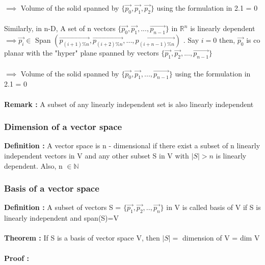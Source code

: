 \documentclass{article}
\begin{document}
    $\implies$ Volume of the solid spanned by $\{ \Vec{p_0},\Vec{p_1},\Vec{p_2}\}$ using the formulation in 2.1 = 0 \\ \\
    Similarly, in n-D, A set of n vectors $\{ \Vec{p_0},\Vec{p_1},...,\Vec{p_{n-1}}\}$ in $\mathbb{R}^n$ is linearly dependent $\implies \Vec{p_i} \in$ Span $(\Vec{p_{(i+1)\%n}},\Vec{p_{(i+2)\%n}},...,\Vec{p_{(i+n-1)\%n}})$ . Say $i = 0$ then, $\Vec{p_0}$ is co planar with the "hyper" plane spanned by vectors $\{ \Vec{p_1},\Vec{p_2},...,\Vec{p_{n-1}}\}$ \\ \\
    $\implies$ Volume of the solid spanned by $\{ \Vec{p_0},\Vec{p_1},...,\Vec{p_{n-1}}\}$ using the formulation in 2.1 = 0 \\ \\
    \textbf{Remark : } A subset of any linearly independent set is also linearly independent 
    \subsubsection{Dimension of a vector space}
    \textbf{Definition : } A vector space is n - dimensional if there exist a subset of n linearly independent vectors in V and any other subset S in V with $|S| > n$ is linearly dependent. Also, n $\in \mathbb{N}$ \\
    \subsubsection{Basis of a vector space}
    \textbf{Definition : } A subset of vectors S = $\{\Vec{p_1},\Vec{p_2},..,\Vec{p_n}\}$ in V is called basis of V if S is linearly independent and span(S)=V \\ \\
    \textbf{Theorem : } If S is a basis of vector space V, then $|S| = $ dimension of V = dim V \\ \\
    \textbf{Proof : }
    
\end{document}
